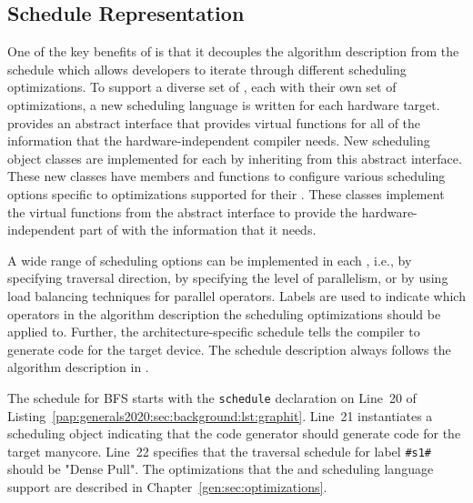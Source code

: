 \subsection{Schedule Representation}
One of the key benefits of \graphit is that it decouples the algorithm description from the schedule which allows developers to iterate through different scheduling optimizations. 
To support a diverse set of \graphvms, each with their own set of optimizations, a new scheduling language is written for each hardware target. 
\GG provides an abstract interface that provides virtual functions for all of the information that the hardware-independent compiler needs.
New scheduling object classes are implemented for each \graphvm by inheriting from this abstract interface. 
These new classes have members and functions to configure various scheduling options specific to optimizations supported for their \graphvms. 
These classes implement the virtual functions from the abstract interface to provide the hardware-independent part of \GG with the information that it needs.

A wide range of scheduling options can be implemented in each \graphvm, i.e., by specifying traversal direction, by specifying the level of parallelism, or by using load balancing techniques for parallel operators.
Labels are used to indicate which operators in the algorithm description the scheduling optimizations should be applied to.
Further, the architecture-specific schedule tells the compiler to generate code for the target device.
The schedule description always follows the algorithm description in \graphit.

The schedule for BFS starts with the \lstinline[language=graphit]{schedule} declaration on Line~20 of Listing~\ref{pap:generals2020:sec:background:lst:graphit}. 
Line~21 instantiates a \hb scheduling object indicating that the code generator should generate code for the target manycore. 
Line~22 specifies that the traversal schedule for label \lstinline[language=graphit]{#s1#} should be "Dense Pull". 
The optimizations that the \hb \graphvm and scheduling language support are described in Chapter~\ref{gen:sec:optimizations}. 

